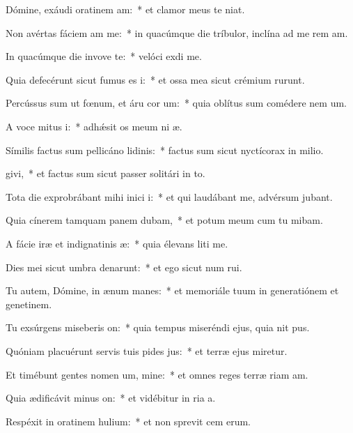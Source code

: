 \item Dómine, exáudi oratinem am:~* et clamor meus  te niat.
\item Non avértas fáciem am  me:~* in quacúmque die tríbulor, inclína ad me rem am.
\item In quacúmque die invove te:~* velóci exdi me.
\item Quia defecérunt sicut fumus es i:~* et ossa mea sicut crémium rurunt.
\item Percússus sum ut fœnum, et áru cor um:~* quia oblítus sum comédere nem um.
\item A voce mitus i:~* adhǽsit os meum ni æ.
\item Símilis factus sum pellicáno lidinis:~* factus sum sicut nyctícorax in milio.
\item {}givi,~* et factus sum sicut passer solitári in to.
\item Tota die exprobrábant mihi inici i:~* et qui laudábant me, advérsum  jubant.
\item Quia cínerem tamquam panem dubam,~* et potum meum cum tu mibam.
\item A fácie iræ et indignatinis æ:~* quia élevans liti me.
\item Dies mei sicut umbra denarunt:~* et ego sicut num rui.
\item Tu autem, Dómine, in ænum manes:~* et memoriále tuum in generatiónem et genetinem.
\item Tu exsúrgens miseberis on:~* quia tempus miseréndi ejus, quia nit pus.
\item Quóniam placuérunt servis tuis pides jus:~* et terræ ejus miretur.
\item Et timébunt gentes nomen um, mine:~* et omnes reges terræ riam am.
\item Quia ædificávit minus on:~* et vidébitur in ria a.
\item Respéxit in oratinem hulium:~* et non sprevit cem erum.
